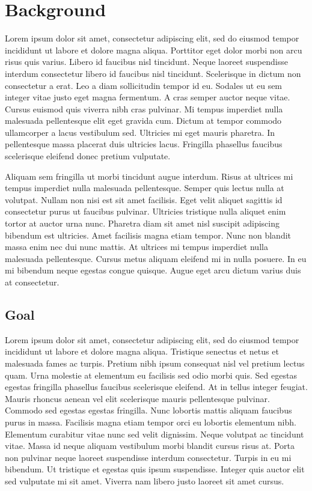 \chapter{Background}
\label{chap:background}

Lorem ipsum dolor sit amet, consectetur adipiscing elit, sed do eiusmod tempor incididunt ut labore et dolore magna aliqua. Porttitor eget dolor morbi non arcu risus quis varius. Libero id faucibus nisl tincidunt. Neque laoreet suspendisse interdum consectetur libero id faucibus nisl tincidunt. Scelerisque in dictum non consectetur a erat. Leo a diam sollicitudin tempor id eu. Sodales ut eu sem integer vitae justo eget magna fermentum. A cras semper auctor neque vitae. Cursus euismod quis viverra nibh cras pulvinar. Mi tempus imperdiet nulla malesuada pellentesque elit eget gravida cum. Dictum at tempor commodo ullamcorper a lacus vestibulum sed. Ultricies mi eget mauris pharetra. In pellentesque massa placerat duis ultricies lacus. Fringilla phasellus faucibus scelerisque eleifend donec pretium vulputate.

Aliquam sem fringilla ut morbi tincidunt augue interdum. Risus at ultrices mi tempus imperdiet nulla malesuada pellentesque. Semper quis lectus nulla at volutpat. Nullam non nisi est sit amet facilisis. Eget velit aliquet sagittis id consectetur purus ut faucibus pulvinar. Ultricies tristique nulla aliquet enim tortor at auctor urna nunc. Pharetra diam sit amet nisl suscipit adipiscing bibendum est ultricies. Amet facilisis magna etiam tempor. Nunc non blandit massa enim nec dui nunc mattis. At ultrices mi tempus imperdiet nulla malesuada pellentesque. Cursus metus aliquam eleifend mi in nulla posuere. In eu mi bibendum neque egestas congue quisque. Augue eget arcu dictum varius duis at consectetur.

\section[Goal]{Goal} %

Lorem ipsum dolor sit amet, consectetur adipiscing elit, sed do eiusmod tempor incididunt ut labore et dolore magna aliqua. Tristique senectus et netus et malesuada fames ac turpis. Pretium nibh ipsum consequat nisl vel pretium lectus quam. Urna molestie at elementum eu facilisis sed odio morbi quis. Sed egestas egestas fringilla phasellus faucibus scelerisque eleifend. At in tellus integer feugiat. Mauris rhoncus aenean vel elit scelerisque mauris pellentesque pulvinar. Commodo sed egestas egestas fringilla. Nunc lobortis mattis aliquam faucibus purus in massa. Facilisis magna etiam tempor orci eu lobortis elementum nibh. Elementum curabitur vitae nunc sed velit dignissim. Neque volutpat ac tincidunt vitae. Massa id neque aliquam vestibulum morbi blandit cursus risus at. Porta non pulvinar neque laoreet suspendisse interdum consectetur. Turpis in eu mi bibendum. Ut tristique et egestas quis ipsum suspendisse. Integer quis auctor elit sed vulputate mi sit amet. Viverra nam libero justo laoreet sit amet cursus.

